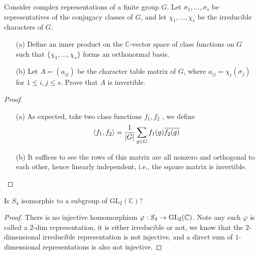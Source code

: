 \begin{prob}[S2004-Q6]
    Consider complex representations of a finite group \( G \). Let \( \sigma_1, \ldots, \sigma_s \) be representatives of the conjugacy classes of \( G \), and let \( \chi_1, \ldots, \chi_s \) be the irreducible characters of \( G \).
    
    \begin{itemize}
        \item[(a)] Define an inner product on the \(\mathbb{C}\)-vector space of class functions on \( G \) such that \( \{\chi_1, \ldots, \chi_s\} \) forms an orthonormal basis.
        
        \item[(b)] Let \( A = (a_{ij}) \) be the character table matrix of \( G \), where \( a_{ij} = \chi_i(\sigma_j) \) for \( 1 \leq i, j \leq s \). Prove that \( A \) is invertible.
    \end{itemize}
\end{prob}
\begin{proof}
    \begin{itemize}
        \item[(a)] As expected, take two class functions $f_1,f_2$ , we define 
        \begin{equation*}
            \langle f_1,f_2\rangle=\frac{1}{|G|}\sum_{g\in G}f_1(g)\overline{f_2(g)}
        \end{equation*}
        \item[(b)] It suffices to see the rows of this matrix are all nonzero and orthogonal to each other, hence linearly independent, i.e., the sqaure matrix is invertible.
    \end{itemize}
\end{proof}







\begin{prob}[S2018-Q4, S2007-Q5]
    Is $S_4$ isomorphic to a subgroup of $\text{GL}_2(\mathbb{C})$?
\end{prob}
\begin{proof}
    There is no injective homomorphism $\varphi: S_4\to\text{GL}_2(\mathbb{C})$. Note any such $\varphi$ is called a $2$-dim representation, it is either irreducible or not, we know that the $2$-dimensional irreducible representation is not injective, and a direct sum of $1$-dimensional representations is also not injective.
\end{proof}


